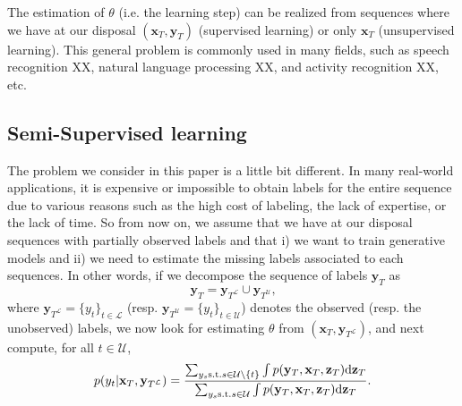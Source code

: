 \documentclass{article}
\def\x{{\mathbf x}}
\def\z{{\mathbf z}}
\def\y{{\mathbf y}}
\def\yl{{\mathbf y}_{T^{\mathcal{L}}}}
\def\yu{{\mathbf y}_{T^{\mathcal{U}}}}
\def\L{{\mathcal L}}
\def\L{\mathcal{L}}
\def\U{\mathcal{U}}
\begin{document}
The estimation of $\theta$ (i.e. the learning step) can be realized from sequences where we have at our disposal $(\x_T,\y_T)$ (supervised learning) or only $\x_T$ (unsupervised learning).
This general problem is commonly used in many fields, such as speech recognition XX, 
natural language processing XX, and activity recognition XX, etc. 





\subsection{Semi-Supervised learning}
The problem we consider in this paper is a little bit different. In many real-world applications, it is expensive or impossible to obtain
labels for the entire sequence due to various reasons such as the high cost of labeling, the lack of expertise, or the lack of time. 
So from now on, we assume that
we have at our disposal sequences with partially observed labels
and that i) we want to train 
generative models and ii) we need to estimate the missing labels associated to each sequences. In other words, if we decompose the sequence of labels $\y_T$ as
$$\y_T  = \yl \cup \yu \text{,}$$
where $\yl=\{y_t\}_{t\in \L}$ (resp. $\yu=\{y_t\}_{t\in \U}$) denotes the observed (resp. the unobserved) labels, we now look for estimating
$\theta$ from  $(\x_T,\yl)$, and next
compute, for all $t \in \U$,
$$p(y_t|\x_T,\yl)=\frac{\sum_{y_s {\rm s.t.}  s \in \U \backslash \{t\}} \int p(\y_T,\x_T,\z_T) {\rm d}\z_T  } { \sum_{y_s {\rm s.t.}  s \in \U} \int p(\y_T,\x_T,\z_T) {\rm d}\z_T} \text{.}$$


\end{document}
